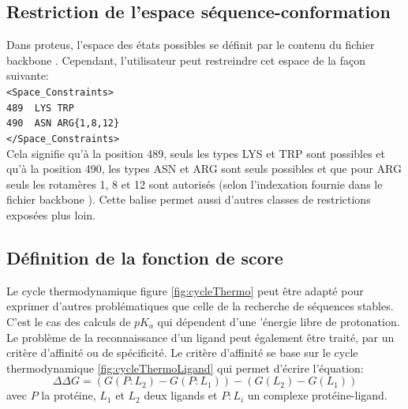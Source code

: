 \subsection{Restriction de l'espace séquence-conformation}
\label{sub:restric}
Dans proteus, l'espace des états possibles se définit par le contenu du fichier \og backbone \fg. Cependant, l'utilisateur peut restreindre cet espace de la façon suivante:\\
\verb!<Space_Constraints>! \\
\verb!489  LYS TRP! \\
\verb!490  ASN ARG{1,8,12}! \\
\verb!</Space_Constraints>! \\
Cela signifie qu'à la position 489, seuls les types LYS et TRP sont possibles et qu'à la position 490, les types ASN et ARG sont seuls possibles et que pour ARG seuls les rotamères 1, 8  et 12 sont autorisés (selon l'indexation fournie dans le fichier \og backbone \fg). Cette balise permet aussi d'autres classes de restrictions exposées plus loin.

\subsection{Définition de la fonction de score }

Le cycle thermodynamique figure \ref{fig:cycleThermo} peut être adapté pour exprimer d'autres problématiques que celle de la recherche de séquences stables. C'est le cas des calculs de $pK_a$ qui dépendent d'une 'énergie libre de protonation. Le  problème de la reconnaissance d'un ligand peut également être traité, par un critère d'affinité ou de spécificité. Le critère d'affinité se base sur le cycle thermodynamique  \ref{fig:cycleThermoLigand} qui permet d'écrire l'équation:
\begin{equation}
   \label{deltaG2}
\Delta \Delta G = (G(P\!:\!L_2)- G(P\!:\!L_1)) - (G(L_2) - G(L_1))
\end{equation}  
avec $P$ la protéine, $L_1$ et $L_2$ deux ligands et $P\!:\!L_i$ un complexe protéine-ligand. 

